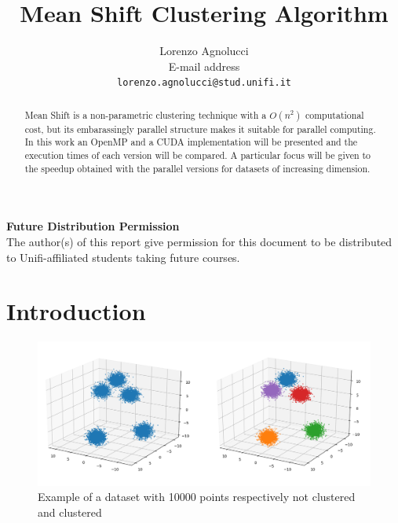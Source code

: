 \documentclass[10pt,twocolumn,letterpaper]{article}
\begin{document}
\title{Mean Shift Clustering Algorithm}

\author{Lorenzo Agnolucci\\
E-mail address\\
{\tt\small lorenzo.agnolucci@stud.unifi.it}
}
\maketitle
\thispagestyle{empty}

\begin{abstract}
Mean Shift is a non-parametric clustering technique with a $O(n^{2})$ 		 computational cost, but its embarassingly parallel structure makes it suitable for parallel computing. In this work an OpenMP and a CUDA implementation will be presented and the execution times of each version will be compared. A particular focus will be given to the speedup obtained with the parallel versions for datasets of increasing dimension.
\end{abstract}

\noindent\large\textbf{Future Distribution Permission}\\
\indent The author(s) of this report give permission for this document to be distributed to Unifi-affiliated students taking future courses.

\section{Introduction}

\begin{figure}[!t]
\includegraphics[width=0.99\linewidth]{img/example_combined}
\caption{Example of a dataset with 10000 points respectively not clustered and clustered}
\label{fig:exampleApplication}
\end{figure}
\end{document}
